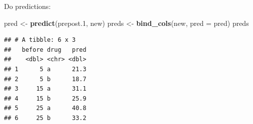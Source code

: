 \documentclass[ignorenonframetext,]{beamer}
\newenvironment{Shaded}{\begin{snugshade}}{\end{snugshade}}
\newcommand{\DataTypeTok}[1]{\textcolor[rgb]{0.13,0.29,0.53}{#1}}
\newcommand{\FloatTok}[1]{\textcolor[rgb]{0.00,0.00,0.81}{#1}}
\newcommand{\KeywordTok}[1]{\textcolor[rgb]{0.13,0.29,0.53}{\textbf{#1}}}
\newcommand{\NormalTok}[1]{#1}
\newcommand{\StringTok}[1]{\textcolor[rgb]{0.31,0.60,0.02}{#1}}
\begin{document}
\begin{frame}[fragile]{Do predictions:}
\protect\hypertarget{do-predictions}{}

\begin{Shaded}
\begin{Highlighting}[]
\NormalTok{pred <-}\StringTok{ }\KeywordTok{predict}\NormalTok{(prepost}\FloatTok{.1}\NormalTok{, new)}
\NormalTok{preds <-}\StringTok{ }\KeywordTok{bind_cols}\NormalTok{(new, }\DataTypeTok{pred =}\NormalTok{ pred)}
\NormalTok{preds}
\end{Highlighting}
\end{Shaded}

\begin{verbatim}
## # A tibble: 6 x 3
##   before drug   pred
##    <dbl> <chr> <dbl>
## 1      5 a      21.3
## 2      5 b      18.7
## 3     15 a      31.1
## 4     15 b      25.9
## 5     25 a      40.8
## 6     25 b      33.2
\end{verbatim}

\end{frame}
\end{document}
